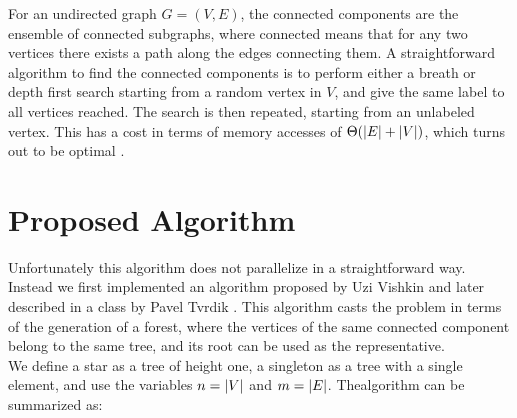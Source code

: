 %

For an undirected graph $G=(V,E)$, the connected components are the ensemble
of connected subgraphs, where connected means that for any two vertices there exists a path along
the edges connecting them.
A straightforward algorithm to find the connected components is to perform either
a breath or depth first search starting from a random vertex in $V$,
and give the same label to all vertices reached. The search is then repeated, starting from an
unlabeled vertex.
This has a cost in terms of memory accesses of $\Theta(\left| E \right| + \left| V \right|)$, which turns out
to be optimal \cite{Hopcroft}.

\section{Proposed Algorithm}\label{sec:yourmethod}
%
%


Unfortunately this algorithm does not parallelize in a straightforward
way. Instead we first implemented
an algorithm proposed by Uzi Vishkin \cite{PCompPaper} and later described in a class by Pavel
Tvrdik \cite{PCompClass}. This algorithm casts the problem in terms of the generation of a
forest, where the vertices of the same connected component belong to the same tree, and its root
can be used as the representative.\\
We define a star as a tree of height one, a singleton as a tree with a single element, and
use the variables $n=\left| V \right|$ and $m=\left| E \right|$.
Thealgorithm can be summarized as:

